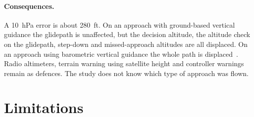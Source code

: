 \documentclass[11pt]{article}
\begin{document}
\paragraph{Consequences.} A 10~hPa error is about 280~ft. On an approach with ground-based vertical guidance the glidepath is unaffected, but the decision altitude, the altitude check on the glidepath, step-down and missed-approach altitudes are all displaced. On an approach using barometric vertical guidance the whole path is displaced~\cite{bea2024}. Radio altimeters, terrain warning using satellite height and controller warnings remain as defences. The study does not know which type of approach was flown.

\section{Limitations}\label{sec:limitations}
\end{document}
